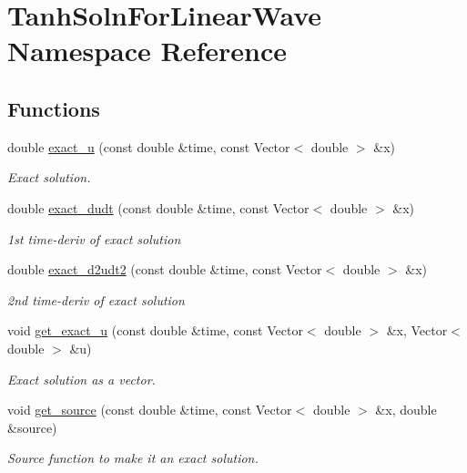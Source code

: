 \hypertarget{namespaceTanhSolnForLinearWave}{}\section{Tanh\+Soln\+For\+Linear\+Wave Namespace Reference}
\label{namespaceTanhSolnForLinearWave}
\subsection*{Functions}
\begin{DoxyCompactItemize}
\item 
double \hyperlink{namespaceTanhSolnForLinearWave_aceea2935b2d3815ce72aae8c9de2b468}{exact\+\_\+u} (const double \&time, const Vector$<$ double $>$ \&x)
\begin{DoxyCompactList}\small\item\em Exact solution. \end{DoxyCompactList}\item 
double \hyperlink{namespaceTanhSolnForLinearWave_aa2081bd3d3d518a38497f664b0e498bc}{exact\+\_\+dudt} (const double \&time, const Vector$<$ double $>$ \&x)
\begin{DoxyCompactList}\small\item\em 1st time-\/deriv of exact solution \end{DoxyCompactList}\item 
double \hyperlink{namespaceTanhSolnForLinearWave_a63b7a0f5fd5d06cc2c0a43322a81fe43}{exact\+\_\+d2udt2} (const double \&time, const Vector$<$ double $>$ \&x)
\begin{DoxyCompactList}\small\item\em 2nd time-\/deriv of exact solution \end{DoxyCompactList}\item 
void \hyperlink{namespaceTanhSolnForLinearWave_a7dd7e9f155d19f871ba87d3fe41fd8e9}{get\+\_\+exact\+\_\+u} (const double \&time, const Vector$<$ double $>$ \&x, Vector$<$ double $>$ \&u)
\begin{DoxyCompactList}\small\item\em Exact solution as a vector. \end{DoxyCompactList}\item 
void \hyperlink{namespaceTanhSolnForLinearWave_a3bc9643b40e62283dc09f405ed17c805}{get\+\_\+source} (const double \&time, const Vector$<$ double $>$ \&x, double \&source)
\begin{DoxyCompactList}\small\item\em Source function to make it an exact solution. \end{DoxyCompactList}\item 

\end{DoxyCompactItemize}
